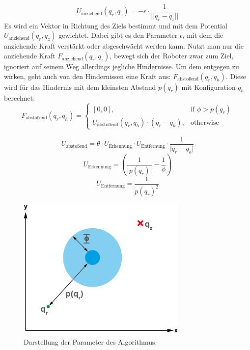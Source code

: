 \begin{equation}
	U_{\text{anziehend}}(q_r, q_z) = - \epsilon \cdot \frac{1}{\lvert\lvert q_r - q_z \rvert\rvert}
\end{equation}
Es wird ein Vektor in Richtung des Ziels bestimmt und mit dem Potential $U_{\text{anziehend}}(q_r, q_z)$ gewichtet. Dabei gibt es den Parameter $\epsilon$, mit dem die anziehende Kraft verstärkt oder abgeschwächt werden kann.
\newline
Nutzt man nur die anziehende Kraft $F_{\text{anziehend}}(q_r, q_z)$, bewegt sich der Roboter zwar zum Ziel, ignoriert auf seinem Weg allerdings jegliche Hindernisse.
Um dem entgegen zu wirken, geht auch von den Hindernissen eine Kraft aus: $F_{\text {abstoßend}}(q_r, q_h)$.
Diese wird für das Hindernis mit dem kleinsten Abstand $p(q_r)$ mit Konfiguration $q_h$  berechnet:
\begin{equation}
	F_{\text{abstoßend}}(q_r, q_h) =
	\begin{cases}
    [0,0] ,& \text{if } \phi > p(q_r)\\
    U_{\text{abstoßend}}(q_r, q_h) \cdot (q_r-q_h),               & \text{otherwise}
\end{cases}
\end{equation}

\begin{equation}
     U_{\text{abstoßend}} = \theta \cdot U_{\text{Erkennung}} \cdot U_{\text{Entfernung}} \cdot \frac{1}{ \lvert q_r - q_o \rvert }
\end{equation}
\begin{equation}
 U_{\text{Erkennung}} = \left( \frac{1}{\lvert p(q_r) \rvert} - \frac{1}{\phi} \right)
\end{equation}
\begin{equation}
U_{\text{Entfernung}} = \frac{1}{p(q_r)^2}
\end{equation}

\begin{figure}
  \centering
  \includegraphics[width=0.7\linewidth, height=0.7\linewidth]{img/Params}
  \caption{Darstellung der Parameter des Algorithmus.}
  \label{fig:params}
\end{figure}


